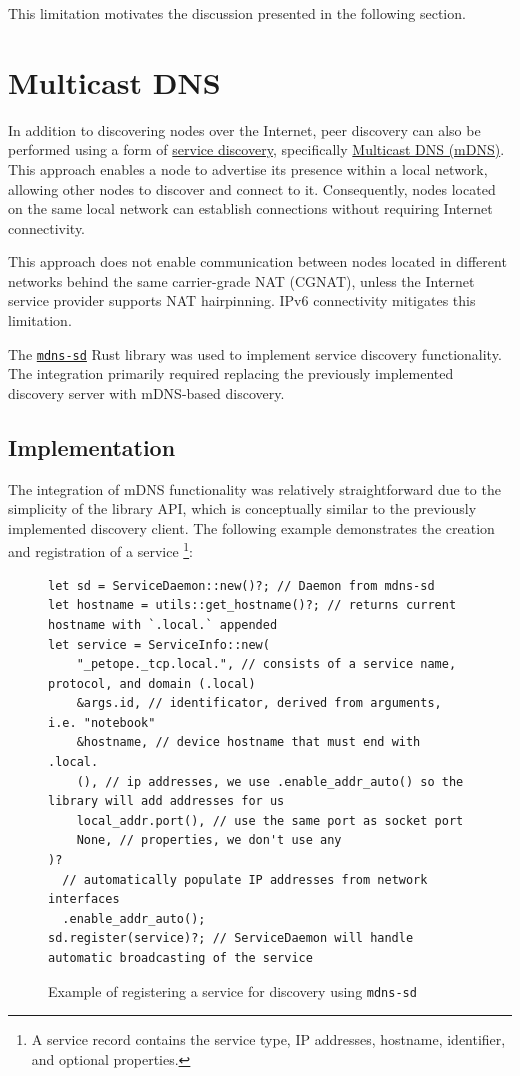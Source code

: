 \documentclass[a4paper, 10pt]{article}
\let\oldsection\section
\renewcommand{\section}{
  \clearpage
  \oldsection
}
\begin{document}
This limitation motivates the discussion presented in the following section.

\section{Multicast DNS}

In addition to discovering nodes over the Internet, peer discovery can also be performed using a form of
\href{https://en.wikipedia.org/wiki/Service_discovery}{service discovery}, specifically
\href{https://en.wikipedia.org/wiki/Multicast_DNS}{Multicast DNS (mDNS)}.
This approach enables a node to advertise its presence within a local network, allowing other nodes
to discover and connect to it. Consequently, nodes located on the same local network can establish
connections without requiring Internet connectivity.

\begin{tcolorbox}
  This approach does not enable communication between nodes located in different networks behind the same
  carrier-grade NAT (CGNAT), unless the Internet service provider supports NAT hairpinning.
  IPv6 connectivity mitigates this limitation.
\end{tcolorbox}

The \href{https://crates.io/crates/mdns-sd}{\texttt{mdns-sd}} Rust library was used to implement
service discovery functionality. The integration primarily required replacing the previously implemented
discovery server with mDNS-based discovery.

\subsection{Implementation}

The integration of mDNS functionality was relatively straightforward due to the simplicity of the library API,
which is conceptually similar to the previously implemented discovery client.
The following example demonstrates the creation and registration of a service
\footnote{A service record contains the service type, IP addresses, hostname, identifier, and optional properties.}:

\begin{figure}[H]
  \begin{verbatim}
let sd = ServiceDaemon::new()?; // Daemon from mdns-sd
let hostname = utils::get_hostname()?; // returns current hostname with `.local.` appended
let service = ServiceInfo::new(
    "_petope._tcp.local.", // consists of a service name, protocol, and domain (.local)
    &args.id, // identificator, derived from arguments, i.e. "notebook"
    &hostname, // device hostname that must end with .local.
    (), // ip addresses, we use .enable_addr_auto() so the library will add addresses for us
    local_addr.port(), // use the same port as socket port
    None, // properties, we don't use any
)?
  // automatically populate IP addresses from network interfaces
  .enable_addr_auto();
sd.register(service)?; // ServiceDaemon will handle automatic broadcasting of the service
  \end{verbatim}
  \caption{Example of registering a service for discovery using \texttt{mdns-sd}}
\end{figure}
\end{document}
